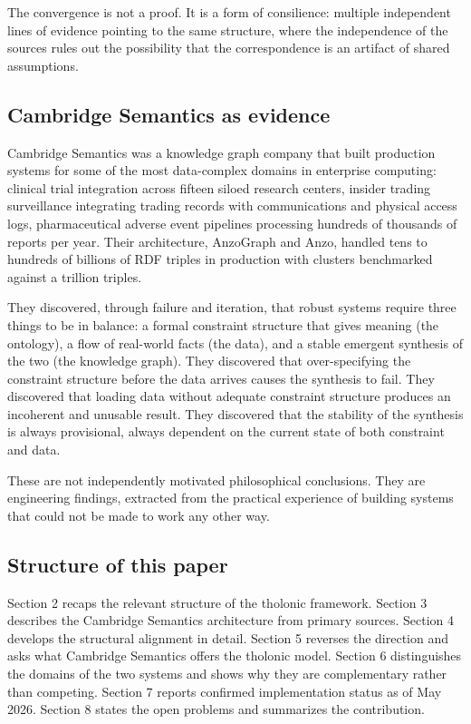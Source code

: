 \documentclass[12pt]{article}
\begin{document}
The convergence is not a proof. It is a form of consilience: multiple
independent lines of evidence pointing to the same structure, where the
independence of the sources rules out the possibility that the
correspondence is an artifact of shared assumptions.

\subsection{Cambridge Semantics as evidence}\label{cambridge-semantics-as-evidence}

Cambridge Semantics was a knowledge graph company that built production
systems for some of the most data-complex domains in enterprise
computing: clinical trial integration across fifteen siloed research
centers, insider trading surveillance integrating trading records with
communications and physical access logs, pharmaceutical adverse event
pipelines processing hundreds of thousands of reports per year. Their
architecture, AnzoGraph and Anzo, handled tens to hundreds of billions
of RDF triples in production with clusters benchmarked against a
trillion triples.

They discovered, through failure and iteration, that robust systems
require three things to be in balance: a formal constraint structure
that gives meaning (the ontology), a flow of real-world facts (the
data), and a stable emergent synthesis of the two (the knowledge graph).
They discovered that over-specifying the constraint structure before the
data arrives causes the synthesis to fail. They discovered that loading
data without adequate constraint structure produces an incoherent and
unusable result. They discovered that the stability of the synthesis is
always provisional, always dependent on the current state of both
constraint and data.

These are not independently motivated philosophical conclusions. They
are engineering findings, extracted from the practical experience of
building systems that could not be made to work any other way.

\subsection{Structure of this paper}\label{structure-of-this-paper}

Section 2 recaps the relevant structure of the tholonic framework.
Section 3 describes the Cambridge Semantics architecture from primary
sources. Section 4 develops the structural alignment in detail. Section
5 reverses the direction and asks what Cambridge Semantics offers the
tholonic model. Section 6 distinguishes the domains of the two systems
and shows why they are complementary rather than competing. Section 7
reports confirmed implementation status as of May 2026. Section 8 states
the open problems and summarizes the contribution.
\end{document}
